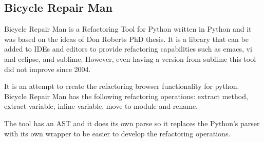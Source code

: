 
\subsection{Bicycle Repair Man}

Bicycle Repair Man is a Refactoring Tool for Python written in Python and it was based on the ideas of Don Roberts PhD thesis. It is a library that can be added to IDEs and editors to provide refactoring capabilities such as emacs, vi and eclipse, and sublime. However, even having a version from sublime this tool did not improve since 2004.

It is an attempt to create the refactoring browser functionality for python. Bicycle Repair Man has the following refactoring operations:
extract method, extract variable, inline variable, move to module and rename.

The tool has an AST and it does its own parse so it replaces the Python's parser with its own wrapper to be easier to develop the refactoring operations.



